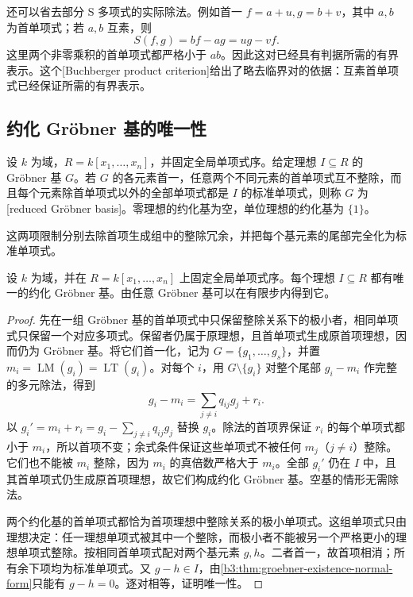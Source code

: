 还可以省去部分 S 多项式的实际除法。例如首一 \(f=a+u,g=b+v\)，其中 \(a,b\) 为首单项式；若 \(a,b\) 互素，则
\[
	S(f,g)=bf-ag=ug-vf.
\]
这里两个非零乘积的首单项式都严格小于 \(ab\)。因此这对已经具有判据所需的有界表示。这个[Buchberger product criterion]给出了略去临界对的依据：互素首单项式已经保证所需的有界表示。

\subsection{约化 Gröbner 基的唯一性}
\label{b3:subsec:0802:03}

\begin{definition}\label{b3:def:reduced-groebner}
	设 \(k\) 为域，\(R=k[x_1,\ldots,x_n]\)，并固定全局单项式序。给定理想 \(I\subseteq R\) 的 Gröbner 基 \(G\)。若 \(G\) 的各元素首一，任意两个不同元素的首单项式互不整除，而且每个元素除首单项式以外的全部单项式都是 \(I\) 的标准单项式，则称 \(G\) 为[reduced Gröbner basis]。零理想的约化基为空，单位理想的约化基为 \(\{1\}\)。
\end{definition}

这两项限制分别去除首项生成组中的整除冗余，并把每个基元素的尾部完全化为标准单项式。

\begin{theorem}\label{b3:thm:reduced-groebner-unique}
	设 \(k\) 为域，并在 \(R=k[x_1,\ldots,x_n]\) 上固定全局单项式序。每个理想 \(I\subseteq R\) 都有唯一的约化 Gröbner 基。由任意 Gröbner 基可以在有限步内得到它。
\end{theorem}
\begin{proof}
	先在一组 Gröbner 基的首单项式中只保留整除关系下的极小者，相同单项式只保留一个对应多项式。保留者仍属于原理想，且首单项式生成原首项理想，因而仍为 Gröbner 基。将它们首一化，记为 \(G=\{g_1,\ldots,g_s\}\)，并置 \(m_i=\operatorname{LM}(g_i)=\operatorname{LT}(g_i)\)。对每个 \(i\)，用 \(G\setminus\{g_i\}\) 对整个尾部 \(g_i-m_i\) 作完整的多元除法，得到
	\[
		g_i-m_i=\sum_{j\ne i}q_{ij}g_j+r_i.
	\]
	以 \(g_i'=m_i+r_i=g_i-\sum_{j\ne i}q_{ij}g_j\) 替换 \(g_i\)。除法的首项界保证 \(r_i\) 的每个单项式都小于 \(m_i\)，所以首项不变；余式条件保证这些单项式不被任何 \(m_j\)（\(j\ne i\)）整除。它们也不能被 \(m_i\) 整除，因为 \(m_i\) 的真倍数严格大于 \(m_i\)。全部 \(g_i'\) 仍在 \(I\) 中，且其首单项式仍生成原首项理想，故它们构成约化 Gröbner 基。空基的情形无需除法。

	两个约化基的首单项式都恰为首项理想中整除关系的极小单项式。这组单项式只由理想决定：任一理想单项式被其中一个整除，而极小者不能被另一个严格更小的理想单项式整除。按相同首单项式配对两个基元素 \(g,h\)。二者首一，故首项相消；所有余下项均为标准单项式。又 \(g-h\in I\)，由\cref{b3:thm:groebner-existence-normal-form}只能有 \(g-h=0\)。逐对相等，证明唯一性。
\end{proof}

